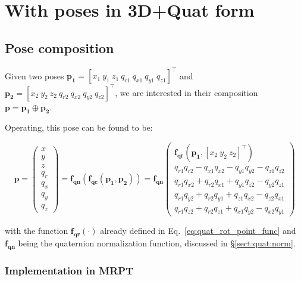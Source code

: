 \documentclass[a4paper,11pt]{report}
\begin{document}
\section{With poses in 3D+Quat form}

\subsection{Pose composition}

Given two poses 
$\mathbf{p_1} = [x_1 ~ y_1 ~ z_1 ~  q_{r1} ~ q_{x1} ~ q_{y1} ~ q_{z1} ] ^ \top$
and 
$\mathbf{p_2} = [x_2 ~ y_2 ~ z_2 ~  q_{r2} ~ q_{x2} ~ q_{y2} ~ q_{z2} ] ^ \top$, 
we are interested in their composition $\mathbf{p}=\mathbf{p_1} \oplus \mathbf{p_2}$.

Operating, this pose can be found to be:

\begin{equation}
\mathbf{p} = 
\left(\begin{array}{c}
 x \\ y \\ z \\ q_r \\ q_x \\ q_y \\ q_z      
\end{array}\right)
= \mathbf{f_{qn}}\left(  \mathbf{f_{qc}}(\mathbf{p_1},\mathbf{p_2}) \right)
=
\mathbf{f_{qn}}
\left(\begin{array}{c}
  \mathbf{f_{qr}} (\mathbf{p_1}, [ x_2 ~ y_2 ~ z_2]^\top ) \\
q_{r1} q_{r2} - q_{x1} q_{x2} - q_{y1} q_{y2} - q_{z1} q_{z2} \\
q_{r1} q_{x2} + q_{r2} q_{x1} + q_{y1} q_{z2} - q_{y2} q_{z1} \\
q_{r1} q_{y2} + q_{r2} q_{y1} + q_{z1} q_{x2} - q_{z2} q_{x1} \\
q_{r1} q_{z2} + q_{r2} q_{z1} + q_{x1} q_{y2} - q_{x2} q_{y1}
\end{array}\right)
\end{equation}

\noindent with the function $\mathbf{f_{qr}}(\cdot)$ already defined in Eq.~\ref{eq:quat_rot_point_func}
and $\mathbf{f_{qn}}$ being the quaternion normalization function, discussed in 
\S \ref{sect:quat:norm}.


\subsubsection{Implementation in MRPT}
\end{document}

